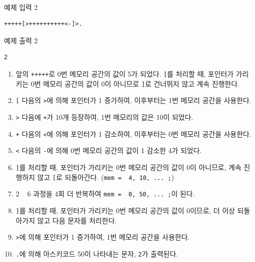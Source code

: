 \\

예제 입력 2

\begin{lstlisting}
+++++[>++++++++++<-]>.
\end{lstlisting}

예제 출력 2

\begin{lstlisting}
2
\end{lstlisting}
\begin{enumerate}
\item 
앞의 \texttt{+++++}로 0번 메모리 공간의 값이 5가 되었다. \texttt{[}를 처리할 때, 포인터가 가리키는 0번 메모리 공간의 값이 0이 아니므로 \texttt{]}로 건너뛰지 않고 계속 진행한다.


\item 
\texttt{[} 다음의 \texttt{>}에 의해 포인터가 1 증가하여, 이후부터는 1번 메모리 공간을 사용한다.


\item 
\texttt{>} 다음에 \texttt{+}가 10개 등장하여, 1번 메모리의 값은 10이 되었다.


\item 
\texttt{+} 다음의 \texttt{<}에 의해 포인터가 1 감소하여, 이후부터는 0번 메모리 공간을 사용한다.


\item 
\texttt{<} 다음의 \texttt{-}에 의해 0번 메모리 공간의 값이 1 감소한 4가 되었다.


\item 
\texttt{]}를 처리할 때, 포인터가 가리키는 0번 메모리 공간의 값이 0이 아니므로, 계속 진행하지 않고 \texttt{[}로 되돌아간다. (\texttt{mem = { 4, 10, ... };})


\item 
2 ~ 6 과정을 4회 더 반복하여 \texttt{mem = { 0, 50, ... };}이 된다.


\item 
\texttt{]}를 처리할 때, 포인터가 가리키는 0번 메모리 공간의 값이 0이므로, 더 이상 되돌아가지 않고 다음 문자를 처리한다.


\item 
\texttt{>}에 의해 포인터가 1 증가하여, 1번 메모리 공간을 사용한다.


\item 
\texttt{.}에 의해 아스키코드 50이 나타내는 문자, \texttt{2}가 출력된다.


\end{enumerate}

